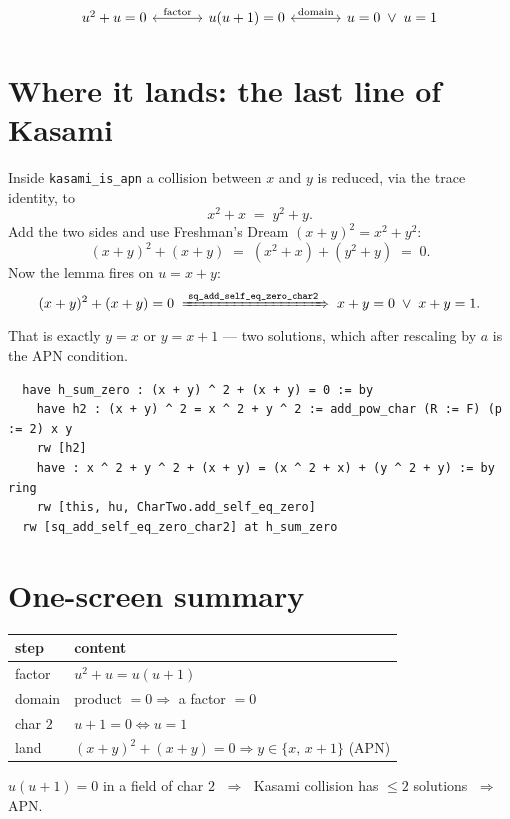 \documentclass[11pt]{article}
\begin{document}
\[
\begin{tikzcd}[column sep=large]
u^2+u=0 \arrow[r, leftrightarrow, "{\text{factor}}"]
& u(u+1)=0 \arrow[r, leftrightarrow, "{\text{domain}}"]
& u=0 \;\lor\; u=1
\end{tikzcd}
\]


\bigskip

\section{Where it lands: the last line of Kasami}

\noindent
Inside \texttt{kasami\_is\_apn} a collision between $x$ and $y$ is reduced,
via the trace identity, to
\[
x^2+x \;=\; y^2+y .
\]
Add the two sides and use Freshman's Dream $(x+y)^2=x^2+y^2$:
\[
(x+y)^2+(x+y) \;=\; (x^2+x)+(y^2+y) \;=\; 0 .
\]
Now the lemma fires on $u=x+y$:
\[
(x+y)^2+(x+y)=0
\;\xRightarrow{\;\texttt{sq\_add\_self\_eq\_zero\_char2}\;}\;
x+y=0 \;\lor\; x+y=1 .
\]
That is exactly $y=x$ or $y=x+1$ --- two solutions, which after rescaling by
$a$ is the APN condition.

\begin{lstlisting}
  have h_sum_zero : (x + y) ^ 2 + (x + y) = 0 := by
    have h2 : (x + y) ^ 2 = x ^ 2 + y ^ 2 := add_pow_char (R := F) (p := 2) x y
    rw [h2]
    have : x ^ 2 + y ^ 2 + (x + y) = (x ^ 2 + x) + (y ^ 2 + y) := by ring
    rw [this, hu, CharTwo.add_self_eq_zero]
  rw [sq_add_self_eq_zero_char2] at h_sum_zero
\end{lstlisting}


\bigskip

\section*{One-screen summary}

\begin{center}
\renewcommand{\arraystretch}{1.6}
\begin{tabular}{l l}
\textbf{step} & \textbf{content} \\
\hline
factor & $u^2+u=u(u+1)$ \\
domain & product $=0 \Rightarrow$ a factor $=0$ \\
char $2$ & $u+1=0 \iff u=1$ \\
land & $(x+y)^2+(x+y)=0 \Rightarrow y\in\{x,\,x+1\}$ \;(APN) \\
\end{tabular}
\end{center}

\bigskip
\noindent
\colorbox{leanbg}{\parbox{\dimexpr\linewidth-2\fboxsep}{\centering
$u(u+1)=0$ in a field of char $2$ $\;\Rightarrow\;$ Kasami collision has
$\le 2$ solutions $\;\Rightarrow\;$ APN.}}
\end{document}
